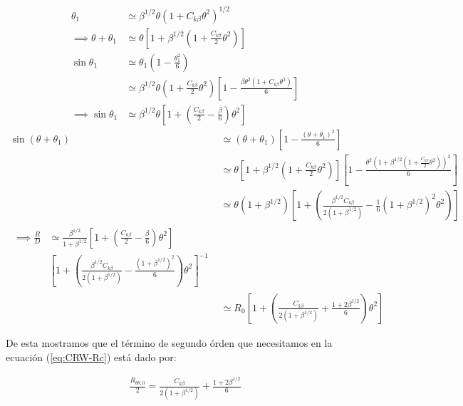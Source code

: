 \begin{align}
  \theta_1 &\simeq \beta^{1/2}\theta\left(1 + C_{k\beta}\theta^2\right)^{1/2} \\
  \implies \theta + \theta_1 &\simeq \theta\left[1 + \beta^{1/2}\left(1 + \frac{C_{k\beta}}{2}\theta^2\right)\right]\\ 
  \sin\theta_1 &\simeq \theta_1\left(1 - \frac{\theta^2_1}{6}\right) \\
  &\simeq \beta^{1/2}\theta\left(1 + \frac{C_{k\beta}}{2}\theta^2\right)\left[1 - \frac{\beta\theta^2\left(1 + C_{k\beta}\theta^2\right)}{6}\right]\\
  \implies \sin\theta_1 &\simeq \beta^{1/2}\theta\left[1 + \left(\frac{C_{k\beta}}{2}- \frac{\beta}{6}\right)\theta^2\right]
\end{align}
\begin{align}
  \sin\left(\theta + \theta_1 \right) &\simeq \left(\theta + \theta_1\right)\left[1 - \frac{\left(\theta + \theta_1\right)^2}{6}\right] \\
           &\simeq \theta\left[1 + \beta^{1/2}\left(1 + \frac{C_{k\beta}}{2}\theta^2\right)\right] \left[1 - \frac{\theta^2\left(1 + \beta^{1/2}
             \left(1 + \frac{C_{k\beta}}{2}\theta^2\right)\right)^2}{6}\right] \\
           &\simeq \theta\left(1 + \beta^{1/2}\right)\left[1 + \left(\frac{\beta^{1/2}C_{k\beta}}{2\left(1 + \beta^{1/2}\right)} - \frac{1}{6}\left(1 + \beta^{1/2}\right)^2
             \theta^2\right)\right]\\
\begin{split}
  \implies \frac{R}{D} &\simeq \frac{\beta^{1/2}}{1 + \beta^{1/2}}\left[1 + \left(\frac{C_{k\beta}}{2} - \frac{\beta}{6}\right)\theta^2\right] \\
               & \left[1 + \left(\frac{\beta^{1/2}C_{k\beta}}{2\left(1 + \beta^{1/2}\right)} - \frac{\left(1 + \beta^{1/2}\right)^2}{6}\right)\theta^2\right]^{-1} 
\end{split}\\
  &\simeq R_0 \left[1 + \left(\frac{C_{k\beta}}{2\left(1+\beta^{1/2}\right)} + \frac{1+2\beta^{1/2}}{6}\right)\theta^2\right] 
\end{align}

De esta mostramos que el término de segundo órden que necesitamos en la ecuación (\ref{eq:CRW-Rc}) está dado por:

\begin{align}
  \frac{R_{\theta\theta, 0}}{2} = \frac{C_{k\beta}}{2\left(1+\beta^{1/2}\right)} + \frac{1+2\beta^{1/2}}{6}
\end{align}

